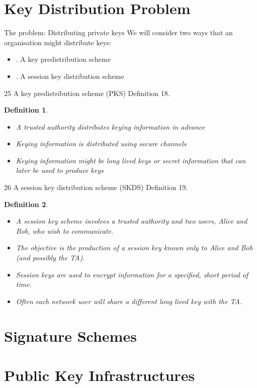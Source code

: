 \documentclass{article}
\theoremstyle{quest}
\newtheorem*{definition}{Definition}
\begin{document}
\pagebreak
\section{Key Distribution Problem}
The problem: Distributing private keys
We will consider two ways that an organisation might distribute keys:
\begin{itemize}
    \item. A key predistribution scheme
    \item. A session key distribution scheme
\end{itemize}
25 A key predistribution scheme (PKS)
Definition 18.
\begin{definition}
    \begin{itemize}
        \item A trusted authority distributes keying information in advance
        \item Keying information is distributed using secure channels
        \item Keying information might be long lived keys or secret information that can later be used to produce keys
    \end{itemize}
\end{definition}
26 A session key distribution scheme (SKDS) Definition 19.
\begin{definition}
    \begin{itemize}
        \item A session key scheme involves a trusted authority and two users, Alice and Bob, who wish to communicate.
        \item The objective is the production of a session key known only to Alice and Bob (and possibly the TA).
        \item Session keys are used to encrypt information for a specified, short period of time.
        \item Often each network user will share a different long lived key with the TA.
    \end{itemize}
\end{definition}

\pagebreak


\pagebreak
\section{Signature Schemes}
\pagebreak
\section{Public Key Infrastructures}
\end{document}
